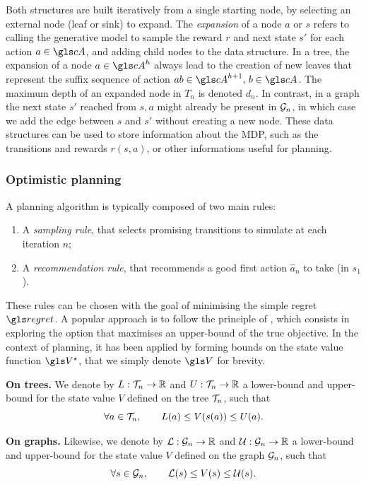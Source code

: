 Both structures are built iteratively from a single starting node, by selecting an external node (leaf or sink) to expand. The \emph{expansion} of a node $a$ or $s$ refers to calling the generative model to sample the reward $r$ and next state $s'$ for each action $a\in \cA$, and adding child nodes to the data structure. In a tree, the expansion of a node $a\in \cA^h$ always lead to the creation of new leaves that represent the suffix sequence of action $ab\in \cA^{h+1},\, b\in \cA$. The maximum depth of an expanded node in $T_n$ is denoted $d_n$. In contrast, in a graph the next state $s'$ reached from $s,a$ might already be present in $\mathcal{G}_n$, in which case we add the edge between $s$ and $s'$ without creating a new node.
These data structures can be used to store information about the \gls{MDP}, such as the transitions and rewards $r(s, a)$, or other informations useful for planning.



\subsubsection{Optimistic planning}

A planning algorithm is typically composed of two main rules:
\begin{enumerate}[label=(\roman*)]
	\item A \emph{sampling rule}, that selects promising transitions to simulate at each iteration $n$;
	\item A \emph{recommendation rule}, that recommends a good first action $\hat{a}_n$ to take (in $s_1$).
\end{enumerate}

These rules can be chosen with the goal of minimising the simple regret $\regret$.
A popular approach is to follow the principle of  \citep[see][]{Munos2014}, which consists in exploring the option that maximises an upper-bound of the true objective. In the context of planning, it has been applied by forming bounds on the state value function $\V^\star$, that we simply denote $\V$ for brevity.

\begin{definition}
	\begin{leftbar}[defnbar]
	{\textbf{On trees.}} We denote by $L:\mathcal{T}_n \rightarrow \mathbb{R}$ and  $U:\mathcal{T}_n \rightarrow \mathbb{R}$ a lower-bound and upper-bound for the state value $V$ defined on the tree $\mathcal{T}_n$, such that
	\begin{equation*}
	\forall a\in\mathcal{T}_n, \qquad L(a) \leq V(s(a)) \leq U(a).
	\end{equation*}
	
	{\textbf{On graphs.}} Likewise, we denote by $\mathcal{L}:\mathcal{G}_n \rightarrow \mathbb{R}$ and  $\mathcal{U}:\mathcal{G}_n \rightarrow \mathbb{R}$ a lower-bound and upper-bound for the state value $V$ defined on the graph $\mathcal{G}_n$, such that
	\begin{equation*}
	\forall s\in\mathcal{G}_n, \qquad \mathcal{L}(s) \leq V(s) \leq \mathcal{U}(s).
	\end{equation*}
	\end{leftbar}
\end{definition}

